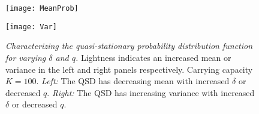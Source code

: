 \iffalse
\begin{figure}[h]
	\centering
	\subfloat[\emph{Probability distribution with $\delta=1.00$ and $K=100$}]{\texttt{[image: Figure1-A]}\label{qsd:q}}
	\hfill
	\subfloat[\emph{Probability distribution with $q=0.06$ and $K=100$}]{\texttt{[image: Figure1-B]}\label{qsd:delta}}
	\caption{\emph{Probability distribution of the population} The conditional probability distribution functions as found using the quasi-stationary distribution algorithm. Note that for each curve, the population cutoff $N$ is outside the domain presented here. In \ref{qsd:q} increasing lightness indicates an increase in $q$. Similarly, the lightness increase in \ref{qsd:delta} corresponds to an increase in $\delta$}
	\label{qsd}
\end{figure}%
\fi
\begin{figure}[h]
	\centering
	\begin{minipage}{0.49\linewidth}
		\centering
		\texttt{[image: MeanProb]}
	\end{minipage}
	\begin{minipage}{0.49\linewidth}
		\centering
		\texttt{[image: Var]}
	\end{minipage}
	\caption{\emph{Characterizing the quasi-stationary probability distribution function for varying $\delta$ and $q$.} Lightness indicates an increased mean or variance in the left and right panels respectively. Carrying capacity $K=100$. 
	\emph{Left:} The QSD has decreasing mean with increased $\delta$ or decreased $q$. 
	\emph{Right:} The QSD has increasing variance with increased $\delta$ or decreased $q$. 
	}
	\label{qsd}
\end{figure}%

